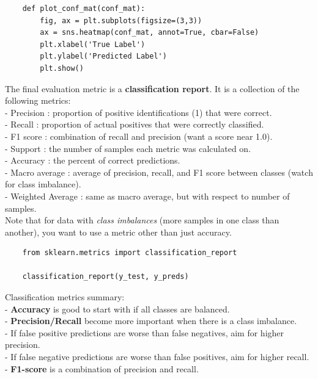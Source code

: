 \documentclass[11pt, a4paper]{article}
\begin{document}
\begin{spacing}{1.1}
\begin{lstlisting}
	def plot_conf_mat(conf_mat):
		fig, ax = plt.subplots(figsize=(3,3))
		ax = sns.heatmap(conf_mat, annot=True, cbar=False)
		plt.xlabel('True Label')
		plt.ylabel('Predicted Label')
		plt.show() \end{lstlisting} \vspace*{1mm}
	The final evaluation metric is a \textbf{classification report}. It is a collection of the following metrics: \\
	\hspace*{2mm} - Precision : proportion of positive identifications (1) that were correct. \\
	\hspace*{2mm} - Recall : proportion of actual positives that were correctly classified. \\
	\hspace*{2mm} - F1 score : combination of recall and precision (want a score near 1.0). \\
	\hspace*{2mm} - Support : the number of samples each metric was calculated on. \\
	\hspace*{2mm} - Accuracy : the percent of correct predictions. \\
	\hspace*{2mm} - Macro average : average of precision, recall, and F1 score between classes (watch for class imbalance). \\
	\hspace*{2mm} - Weighted Average : same as macro average, but with respect to number of samples. \vspace*{1mm} \\
	Note that for data with \textit{class imbalances} (more samples in one class than another), you want to use a metric other than just accuracy. 
	\begin{lstlisting}
	from sklearn.metrics import classification_report
	
	classification_report(y_test, y_preds) \end{lstlisting} \vspace*{1mm}
	Classification metrics summary: \\
	\hspace*{2mm} - \textbf{Accuracy} is good to start with if all classes are balanced.\\
	\hspace*{2mm} - \textbf{Precision/Recall} become more important when there is a class imbalance. \\
	\hspace*{2mm} - If false positive predictions are worse than false negatives, aim for higher precision. \\
	\hspace*{2mm} - If false negative predictions are worse than false positives, aim for higher recall. \\
	\hspace*{2mm} - \textbf{F1-score} is a combination of precision and recall. \newpage
	

\end{spacing}
\end{document}
